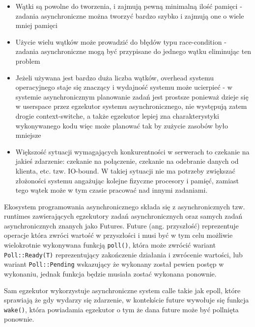 \begin{itemize}
    \item Wątki są powolne do tworzenia, i zajmują pewną minimalną ilość pamięci - zadania
          asynchroniczne można tworzyć bardzo szybko i zajmują one o wiele mniej pamięci
    \item Użycie wielu wątków może prowadzić do błędów typu race-condition - zadania asynchroniczne
          mogą być przypisane do jednego wątku eliminując ten problem
    \item Jeżeli używana jest bardzo duża liczba wątków, overhead systemu operacyjnego staje się
          znaczący i wydajność systemu może ucierpieć - w systemie asynchronicznym planowanie zadań
          jest prostsze ponieważ dzieje się w userspace przez egzekutor systemu asynchronicznego,
          nie występują zatem drogie context-switche, a także egzekutor lepiej zna charakterystyki
          wykonywanego kodu więc może planować tak by zużycie zasobów było mniejsze
    \item Większość sytuacji wymagających konkurentności w serwerach to czekanie na jakieś
          zdarzenie: czekanie na połączenie, czekanie na odebranie danych od klienta, etc. tzw.
          IO-bound. W takiej sytuacji nie ma potrzeby zwiększać złożoności systemu angażując kolejne
          fizyczne procesory i pamięć, zamiast tego wątek może w tym czasie pracować nad innymi
          zadaniami.
\end{itemize}

Ekosystem programowania asynchronicznego składa się z asynchronicznych tzw. runtimes zawierających
egzekutory zadań asynchronicznych oraz samych zadań asynchronicznych znanych jako Futures. Future
(ang. przyszłość) reprezentuje operacje która zwróci wartość w przyszłości i musi być w tym celu
możliwie wielokrotnie wykonywana funkcją \verb|poll()|, która może zwrócić wariant
\verb|Poll::Ready(T)| reprezentujący zakończenie działania i zwrócenie wartości, lub wariant
\verb|Poll::Pending| wskazujący że wykonany został pewien postęp w wykonaniu, jednak funkcja będzie
musiała zostać wykonana ponownie.

Sam egzekutor wykorzystuje asynchroniczne system calle takie jak epoll, które sprawiają że gdy
wydarzy się zdarzenie, w kontekście future wywołuje się funkcja \verb|wake()|, która powiadamia
egzekutor o tym że dana future może być pollnięta ponownie.

